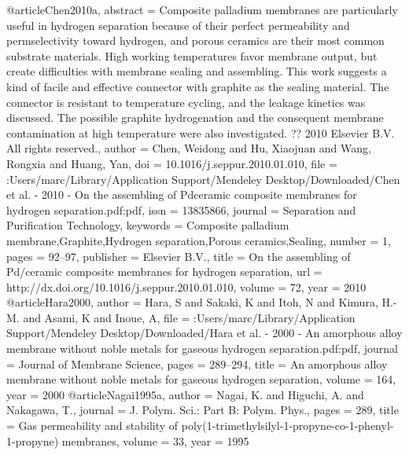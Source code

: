 @article{Chen2010a,
abstract = {Composite palladium membranes are particularly useful in hydrogen separation because of their perfect permeability and permselectivity toward hydrogen, and porous ceramics are their most common substrate materials. High working temperatures favor membrane output, but create difficulties with membrane sealing and assembling. This work suggests a kind of facile and effective connector with graphite as the sealing material. The connector is resistant to temperature cycling, and the leakage kinetics was discussed. The possible graphite hydrogenation and the consequent membrane contamination at high temperature were also investigated. ?? 2010 Elsevier B.V. All rights reserved.},
author = {Chen, Weidong and Hu, Xiaojuan and Wang, Rongxia and Huang, Yan},
doi = {10.1016/j.seppur.2010.01.010},
file = {:Users/marc/Library/Application Support/Mendeley Desktop/Downloaded/Chen et al. - 2010 - On the assembling of Pdceramic composite membranes for hydrogen separation.pdf:pdf},
issn = {13835866},
journal = {Separation and Purification Technology},
keywords = {Composite palladium membrane,Graphite,Hydrogen separation,Porous ceramics,Sealing},
number = {1},
pages = {92--97},
publisher = {Elsevier B.V.},
title = {{On the assembling of Pd/ceramic composite membranes for hydrogen separation}},
url = {http://dx.doi.org/10.1016/j.seppur.2010.01.010},
volume = {72},
year = {2010}
}
@article{Hara2000,
author = {Hara, S and Sakaki, K and Itoh, N and Kimura, H.-M. and Asami, K and Inoue, A},
file = {:Users/marc/Library/Application Support/Mendeley Desktop/Downloaded/Hara et al. - 2000 - An amorphous alloy membrane without noble metals for gaseous hydrogen separation.pdf:pdf},
journal = {Journal of Membrane Science},
pages = {289--294},
title = {{An amorphous alloy membrane without noble metals for gaseous hydrogen separation}},
volume = {164},
year = {2000}
}
@article{Nagai1995a,
author = {Nagai, K. and Higuchi, A. and Nakagawa, T.},
journal = {J. Polym. Sci.: Part B: Polym. Phys.},
pages = {289},
title = {{Gas permeability and stability of poly(1-trimethylsilyl-1-propyne-co-1-phenyl-1-propyne) membranes}},
volume = {33},
year = {1995}
}

